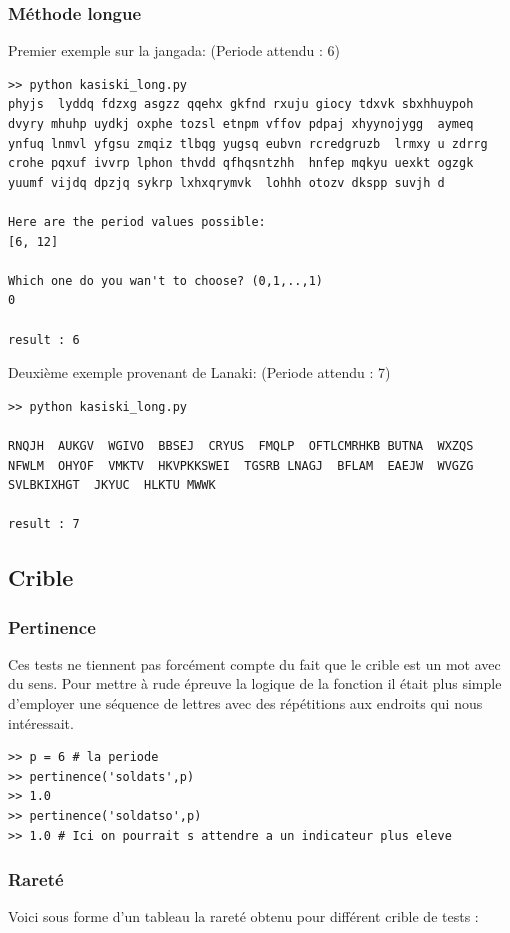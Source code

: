 \documentclass[a4paper, 11pt]{article}
\begin{document}
\subsubsection{Méthode longue}
Premier exemple sur la jangada: (Periode attendu : 6)\\

\begin{lstlisting}
>> python kasiski_long.py 
phyjs  lyddq fdzxg asgzz qqehx gkfnd rxuju giocy tdxvk sbxhhuypoh  dvyry mhuhp uydkj oxphe tozsl etnpm vffov pdpaj xhyynojygg  aymeq ynfuq lnmvl yfgsu zmqiz tlbqg yugsq eubvn rcredgruzb  lrmxy u zdrrg crohe pqxuf ivvrp lphon thvdd qfhqsntzhh  hnfep mqkyu uexkt ogzgk yuumf vijdq dpzjq sykrp lxhxqrymvk  lohhh otozv dkspp suvjh d

Here are the period values possible:
[6, 12]

Which one do you wan't to choose? (0,1,..,1)
0

result : 6
\end{lstlisting}

Deuxième exemple provenant de Lanaki: (Periode attendu : 7)
\begin{lstlisting}
>> python kasiski_long.py 

RNQJH  AUKGV  WGIVO  BBSEJ  CRYUS  FMQLP  OFTLCMRHKB BUTNA  WXZQS  NFWLM  OHYOF  VMKTV  HKVPKKSWEI  TGSRB LNAGJ  BFLAM  EAEJW  WVGZG  SVLBKIXHGT  JKYUC  HLKTU MWWK

result : 7
\end{lstlisting}


\subsection{Crible}

\subsubsection{Pertinence}
Ces tests ne tiennent pas forcément compte du fait que le crible est
un mot avec du sens.
Pour mettre à rude épreuve la logique de la fonction il était plus
simple d'employer une séquence de lettres avec des répétitions aux
endroits qui nous intéressait.

\begin{lstlisting}
>> p = 6 # la periode
>> pertinence('soldats',p)
>> 1.0
>> pertinence('soldatso',p)
>> 1.0 # Ici on pourrait s attendre a un indicateur plus eleve
\end{lstlisting}

\subsubsection{Rareté}
Voici sous forme d'un tableau la rareté obtenu pour différent crible
de tests : \\
\end{document}
